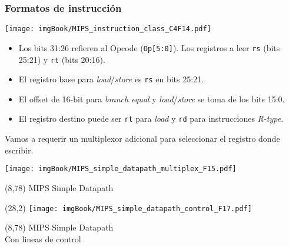\documentclass[aspectratio=169]{beamer}
\begin{document}
\begin{frame}[t,fragile]
    \frametitle{Formatos de instrucción}
    \vspace{-0.2cm}
    \begin{center}
    \texttt{[image: imgBook/MIPS\_instruction\_class\_C4F14.pdf]}
    \end{center}
    \small
    \pause
    \begin{itemize}
    \setlength\itemsep{-0.1cm}
    \item Los bits 31:26 refieren al Opcode (\texttt{Op[5:0]}). Los registros a leer \texttt{rs} (bits 25:21) y \texttt{rt} (bits 20:16).
    \item El registro base para \emph{load}/\emph{store} es \texttt{rs} en bits 25:21.
    \item El offset de 16-bit para \emph{branch equal} y \emph{load}/\emph{store} se toma de los bits 15:0.
    \item El registro destino puede ser \texttt{rt} para \emph{load} y \texttt{rd} para instrucciones \emph{R-type}.
    \end{itemize}
    \textcolor{verdeuca}{Vamos a requerir un multiplexor adicional para seleccionar el registro donde escribir.}
\end{frame}

\begin{frame}
    \texttt{[image: imgBook/MIPS\_simple\_datapath\_multiplex\_F15.pdf]}
    \begin{textblock}{80}(8,78)
    \textcolor{naranjauca}{\Large MIPS Simple Datapath}
    \end{textblock}
\end{frame}

\begin{frame}
    \begin{textblock}{80}(28,2)
    \texttt{[image: imgBook/MIPS\_simple\_datapath\_control\_F17.pdf]}
    \end{textblock}
    \begin{textblock}{80}(8,78)
    \textcolor{naranjauca}{\Large MIPS Simple Datapath\\ \normalsize Con lineas de control}
    \end{textblock}
\end{frame}
\end{document}

